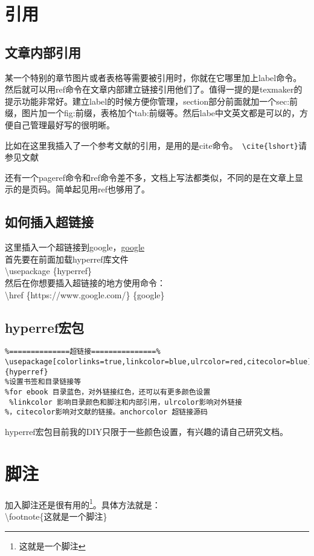 \section{引用}
\subsection{文章内部引用}
某一个特别的章节图片或者表格等需要被引用时，你就在它哪里加上label命令。然后就可以用ref命令在文章内部建立链接引用他们了。值得一提的是texmaker的提示功能非常好。建立label的时候方便你管理，section部分前面就加一个sec:前缀，图片加一个fig:前缀，表格加个tab:前缀等。然后labe中文英文都是可以的，方便自己管理最好写的很明晰。

比如在这里我插入了一个参考文献的引用，是用的是cite命令。\verb+ \cite{lshort}+请参见文献\cite{lshort}

还有一个pageref命令和ref命令差不多，文档上写法都类似，不同的是在文章上显示的是页码。简单起见用ref也够用了。


\subsection{如何插入超链接}
这里插入一个超链接到google，\href{https://www.google.com/}{google}\\
首先要在前面加载hyperref库文件\\
\textbackslash usepackage \{hyperref\}\\
然后在你想要插入超链接的地方使用命令：\\
\textbackslash href \{https://www.google.com/\} \{google\}\\

\subsection{hyperref宏包}
\begin{verbatim}
%==============超链接===============%
\usepackage[colorlinks=true,linkcolor=blue,ulrcolor=red,citecolor=blue]{hyperref} 
%设置书签和目录链接等
%for ebook 目录蓝色，对外链接红色，还可以有更多颜色设置   
 %linkcolor 影响目录颜色和脚注和内部引用，ulrcolor影响对外链接
%，citecolor影响对文献的链接。anchorcolor 超链接源码
\end{verbatim}
hyperref宏包目前我的DIY只限于一些颜色设置，有兴趣的请自己研究文档。

\section{脚注}
加入脚注还是很有用的\footnote{这就是一个脚注}。具体方法就是：\\
\textbackslash footnote\{这就是一个脚注\} 


